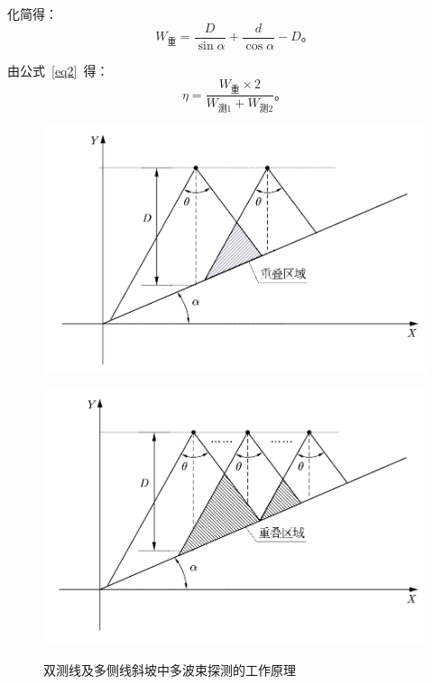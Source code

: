 \documentclass[withoutpreface,bwprint]{cumcmthesis} %
\begin{document}
    化简得：
    \begin{equation}
        W_\text{重} = \frac{D}{\sin\alpha} + \frac{d}{\cos\alpha} - D \text{。}
    \end{equation}
    
    由公式~\eqref{eq2}~得：
    \begin{equation}
        \eta = \frac{W_\text{重} \times 2}{W_\text{测1} + W_\text{测2}} \text{。}
    \end{equation}
    



    \begin{figure}[htbp]
        \centering
        \begin{minipage}[c]{0.48\textwidth}
            \centering
            \includegraphics[height=0.2\textheight]{双波斜面.png}
            \label{4}
        \end{minipage}
        \begin{minipage}[c]{0.48\textwidth}
            \centering
            \includegraphics[height=0.2\textheight]{多波斜面.png}
            \label{5}
        \end{minipage}
        \caption{双测线及多侧线斜坡中多波束探测的工作原理}
    \end{figure}
\end{document}
